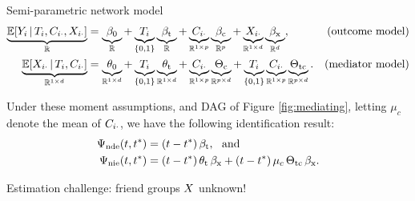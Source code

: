 \documentclass[final]{beamer}
\newlength{\colwidth}
\begin{document}
\begin{frame}[t]
\begin{columns}[t]
\begin{column}{\colwidth}
\begin{block}{Semi-parametric network model}
        \begin{equation*}
          \begin{aligned}
            \underbrace{\E[T_i, \C_{i \cdot}, \X_{i \cdot}]{Y_i}}_{\R}
             & = \underbrace{\betazero}_{\R}
            + \underbrace{T_i}_{\{0, 1\}} \underbrace{\betat}_{\R}
            + \underbrace{\C_{i \cdot}}_{\R^{1 \times p}} \underbrace{\betac}_{\R^{p}}
            + \underbrace{\X_{i \cdot}}_{\R^{1 \times d}} \underbrace{\betax}_{\R^d},
             & \text{(outcome model)}                      \\
            \underbrace{\E[T_i, \C_{i \cdot}]{\X_{i \cdot}}}_{\R^{1 \times d}}
             & = \underbrace{\thetazero}_{\R^{1 \times d}}
            + \underbrace{T_i}_{\{0, 1\}} \underbrace{\thetat}_{\R^{1 \times d}}
            + \underbrace{\C_{i \cdot}}_{\R^{1 \times p}} \underbrace{\Thetac}_{\R^{p \times d}}
            + \underbrace{T_i}_{\{0, 1\}} \underbrace{\C_{i \cdot}}_{\R^{1 \times p}} \underbrace{\Thetatc}_{\R^{p \times d}}.
             & \text{(mediator model)}
          \end{aligned}
        \end{equation*}

        Under these moment assumptions, and DAG of Figure \ref{fig:mediating}, letting $\mu_c$ denote the mean of $C_{i \cdot}$, we have the following identification result:
        \begin{align*}
          \ndef & = \paren*{t - t^*} \, \betat, ~ \text{ and }                                        \\
          \nief & = \paren*{t - t^*} \, \thetat \, \betax + (t - t^*) \, \mu_c \, \Thetatc \, \betax.
        \end{align*}
      \end{block}

      \begin{block}{Estimation challenge: friend groups $X$ unknown!}


\end{block}
\end{column}
\end{columns}
\end{frame}
\end{document}

